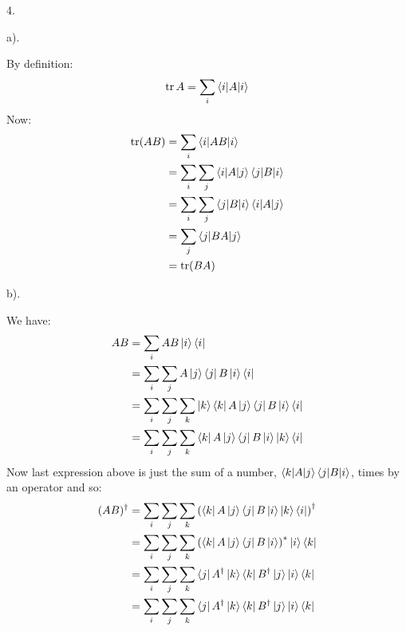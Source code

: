 \documentclass[a4paper,12pt]{article}
\begin{document}
4.
\begin{minipage}[t]{0.9\textwidth}
  a).
  \begin{minipage}[t]{\textwidth}
    By definition:
    \begin{equation*}
      \trace{A} = \sum_i \braket{i|A|i}
    \end{equation*}
    Now:
    \begin{align*}
      \trace(AB) &= \sum_i \braket{i|AB|i}\\
                 &= \sum_i\sum_j \braket{i|A|j}\braket{j|B|i}\\
                 &= \sum_i\sum_j \braket{j|B|i}\braket{i|A|j}\\
                 &= \sum_j \braket{j|BA|j}\\
                 &= \trace(BA)
    \end{align*}

  \end{minipage}

  b).
  \begin{minipage}[t]{\textwidth}
    We have:
    \begin{align*}
      AB &= \sum_{i} AB\ket{i}\bra{i}\\
         &= \sum_{i}\sum_{j} A\ket{j} \bra{j}B\ket{i}\bra{i}\\
         &= \sum_{i}\sum_{j}\sum_{k} \ket{k} \bra{k}A\ket{j} \bra{j}B\ket{i}\bra{i}\\
         &= \sum_{i}\sum_{j}\sum_{k}  \bra{k}A\ket{j} \bra{j}B\ket{i} \ket{k}\bra{i}\\
    \end{align*}
    Now last expression above is just the sum of a number, $\braket{k|A|j}\braket{j|B|i}$, times by an operator and so:
    \begin{align*}
      (AB)^\dagger &= \sum_{i}\sum_{j}\sum_{k} \left(\bra{k}A\ket{j} \bra{j}B\ket{i} \ket{k}\bra{i}\right)^\dagger\\
                   &= \sum_{i}\sum_{j}\sum_{k} \left(\bra{k}A\ket{j} \bra{j}B\ket{i}\right)^* \ket{i}\bra{k}\\
                   &= \sum_{i}\sum_{j}\sum_{k} \bra{j}A^\dagger\ket{k} \bra{k}B^\dagger\ket{j} \ket{i}\bra{k}\\
                   &= \sum_{i}\sum_{j}\sum_{k} \bra{j}A^\dagger\ket{k} \bra{k}B^\dagger\ket{j} \ket{i}\bra{k}\\
    \end{align*}
  \end{minipage}
\end{minipage}
\end{document}
